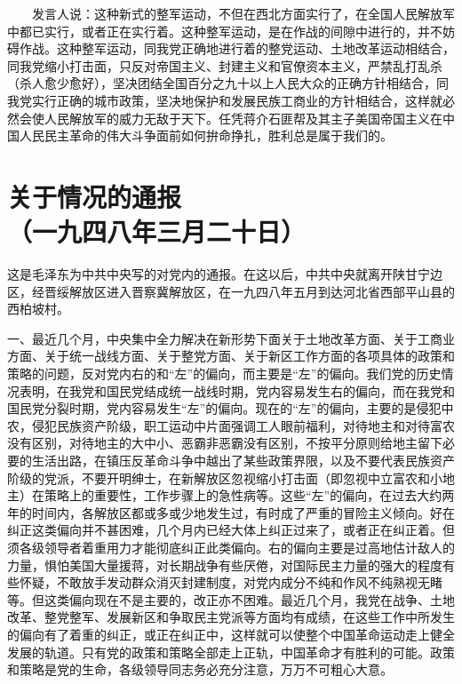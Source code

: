 \documentclass[cn,11pt,chinese]{elegantbook}
\def\myformat#1{\hfil\hfil #1}
\begin{document}
　　发言人说：这种新式的整军运动，不但在西北方面实行了，在全国人民解放军中都已实行，或者正在实行着。这种整军运动，是在作战的间隙中进行的，并不妨碍作战。这种整军运动，同我党正确地进行着的整党运动、土地改革运动相结合，同我党缩小打击面，只反对帝国主义、封建主义和官僚资本主义，严禁乱打乱杀（杀人愈少愈好），坚决团结全国百分之九十以上人民大众的正确方针相结合，同我党实行正确的城市政策，坚决地保护和发展民族工商业的方针相结合，这样就必然会使人民解放军的威力无敌于天下。任凭蒋介石匪帮及其主子美国帝国主义在中国人民民主革命的伟大斗争面前如何拚命挣扎，胜利总是属于我们的。\\
\newpage\section*{\myformat{关于情况的通报}\\\myformat{（一九四八年三月二十日）}}
\begin{introduction}\item  这是毛泽东为中共中央写的对党内的通报。在这以后，中共中央就离开陕甘宁边区，经晋绥解放区进入晋察冀解放区，在一九四八年五月到达河北省西部平山县的西柏坡村。\end{introduction}
一、最近几个月，中央集中全力解决在新形势下面关于土地改革方面、关于工商业方面、关于统一战线方面、关于整党方面、关于新区工作方面的各项具体的政策和策略的问题，反对党内右的和“左”的偏向，而主要是“左”的偏向。我们党的历史情况表明，在我党和国民党结成统一战线时期，党内容易发生右的偏向，而在我党和国民党分裂时期，党内容易发生“左”的偏向。现在的“左”的偏向，主要的是侵犯中农，侵犯民族资产阶级，职工运动中片面强调工人眼前福利，对待地主和对待富农没有区别，对待地主的大中小、恶霸非恶霸没有区别，不按平分原则给地主留下必要的生活出路，在镇压反革命斗争中越出了某些政策界限，以及不要代表民族资产阶级的党派，不要开明绅士，在新解放区忽视缩小打击面（即忽视中立富农和小地主）在策略上的重要性，工作步骤上的急性病等。这些“左”的偏向，在过去大约两年的时间内，各解放区都或多或少地发生过，有时成了严重的冒险主义倾向。好在纠正这类偏向并不甚困难，几个月内已经大体上纠正过来了，或者正在纠正着。但须各级领导者着重用力才能彻底纠正此类偏向。右的偏向主要是过高地估计敌人的力量，惧怕美国大量援蒋，对长期战争有些厌倦，对国际民主力量的强大的程度有些怀疑，不敢放手发动群众消灭封建制度，对党内成分不纯和作风不纯熟视无睹等。但这类偏向现在不是主要的，改正亦不困难。最近几个月，我党在战争、土地改革、整党整军、发展新区和争取民主党派等方面均有成绩，在这些工作中所发生的偏向有了着重的纠正，或正在纠正中，这样就可以使整个中国革命运动走上健全发展的轨道。只有党的政策和策略全部走上正轨，中国革命才有胜利的可能。政策和策略是党的生命，各级领导同志务必充分注意，万万不可粗心大意。\\
\end{document}
